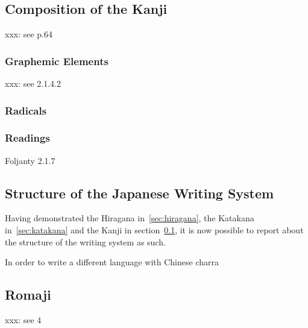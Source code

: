 \subsection{Composition of the Kanji }
\label{sec:compositionofkanji}

xxx: see  p.64


\subsubsection{Graphemic Elements}
\label{sec:graphemicelements}

xxx: see  2.1.4.2

\subsubsection{Radicals}
\label{sec:radicals}


\subsubsection{Readings}
\label{sec:readings}
Foljanty 2.1.7

\subsection{Structure of the Japanese Writing System}
\label{sec:structureofwritingsystem}
Having demonstrated the Hiragana in~\ref{sec:hiragana}, the Katakana 
in~\ref{sec:katakana} and the Kanji in section~\ref{sec:compositionofkanji}, 
it is now possible to report about the structure of the writing system as such.

In order to write a different language with Chinese charra

\subsection{Romaji }
\label{sec:romaji}
xxx: see  4

